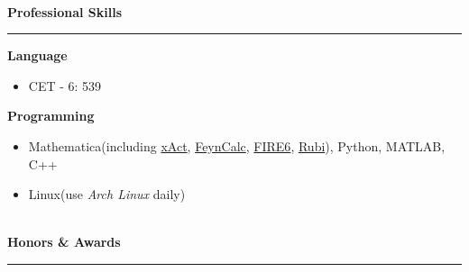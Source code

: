\documentclass[12pt]{article}
\newcommand{\sect}[1]{
    ~\\ \noindent \textbf{#1} \medskip \hrule \medskip
}
\begin{document}

\sect{Professional Skills}

\textbf{Language}
\begin{itemize}[noitemsep,nolistsep]
    \item CET - 6: 539
\end{itemize}

\textbf{Programming}
\begin{itemize}[noitemsep,nolistsep]
    \item Mathematica(including \href{http://xact.es/index.html}{xAct}, \href{https://feyncalc.github.io/}{FeynCalc}, \href{https://arxiv.org/abs/1901.07808}{FIRE6}, \href{https://rulebasedintegration.org/}{Rubi}), Python, MATLAB, C++
    \item Linux(use \textit{Arch Linux} daily)
\end{itemize}


\sect{Honors \& Awards}
\end{document}
